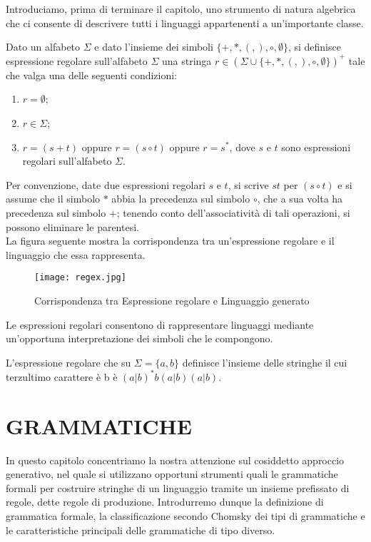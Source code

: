 \documentclass{article}
\begin{document}
Introduciamo, prima di terminare il capitolo, uno strumento di natura algebrica che ci consente di descrivere tutti i linguaggi appartenenti a un'importante classe.
\\\noindent
\begin{definition} %
Dato un alfabeto \( \Sigma \) e dato l’insieme dei simboli \( \{+, *, (, ), \circ, \emptyset\} \), si definisce espressione regolare sull’alfabeto \( \Sigma \) una stringa \( r \in (\Sigma \cup \{+, *, (, ), \circ, \emptyset\})^+ \) tale che valga una delle seguenti condizioni:
\begin{enumerate}
    \item \( r = \emptyset \);
    \item \( r \in \Sigma \);
    \item \( r = (s + t) \) oppure \( r = (s \circ t) \) oppure \( r = s^* \), dove \( s \) e \( t \) sono espressioni regolari sull’alfabeto \( \Sigma \).
\end{enumerate}
\end{definition}
\noindent
Per convenzione, date due espressioni regolari \( s \) e \( t \), si scrive \( st \) per \( (s \circ t) \) e si assume che il simbolo \( * \) abbia la precedenza sul simbolo \( \circ \), che a sua volta ha precedenza sul simbolo \( + \); tenendo conto dell’associatività di tali operazioni, si possono eliminare le parentesi.
\\La figura seguente  mostra la corrispondenza tra un’espressione regolare e il linguaggio che essa rappresenta.
\begin{figure}[H]
    \centering
    \texttt{[image: regex.jpg]}
    \caption{Corrispondenza tra Espressione regolare e Linguaggio generato}
    \label{fig:regex}
\end{figure}
Le espressioni regolari consentono di rappresentare linguaggi mediante un'opportuna interpretazione dei simboli che le compongono.\\
\noindent
\begin{example}
L'espressione regolare che su \( \Sigma = \{a,b\} \) definisce l'insieme delle stringhe il cui terzultimo carattere è b è \( (a|b)^*b(a|b)(a|b) \).
\end{example}

\section{GRAMMATICHE}
In questo capitolo concentriamo la nostra attenzione sul cosiddetto approccio generativo, nel quale si utilizzano opportuni strumenti quali le grammatiche formali per costruire stringhe di un linguaggio tramite un insieme prefissato di regole, dette regole di produzione. Introdurremo dunque la definizione di grammatica formale, la classificazione secondo Chomsky dei tipi di grammatiche e le caratteristiche principali delle grammatiche di tipo diverso.
\end{document}
